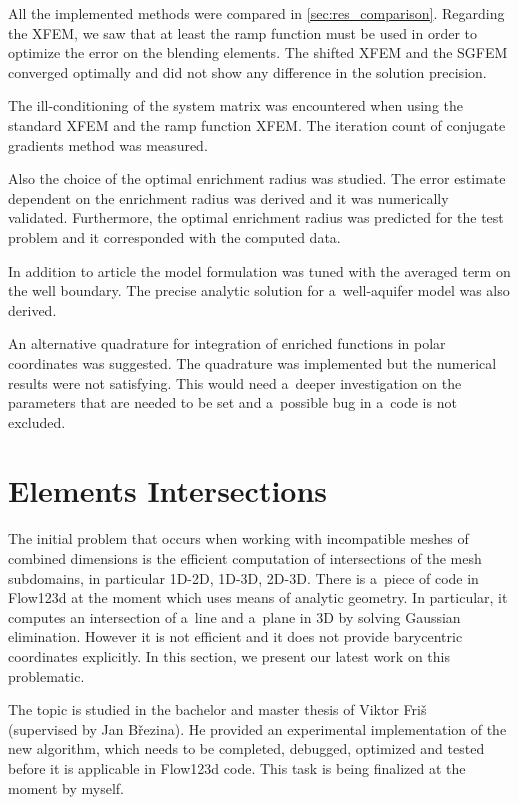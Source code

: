 \documentclass[dvipsnames,FM,Dis]{tulthesis}
\begin{document}
All the implemented methods were compared in \ref{sec:res_comparison}. Regarding the XFEM, we saw that at 
least the ramp function must be used in order to optimize the error on the blending elements. 
The shifted XFEM and the SGFEM converged optimally and did not show any difference in the solution precision.

The ill-conditioning of the system matrix was encountered when using the standard XFEM and the ramp function XFEM.
The iteration count of conjugate gradients method was measured.

Also the choice of the optimal enrichment radius was studied. The error estimate dependent on the enrichment
radius was derived and it was numerically validated. Furthermore, the optimal enrichment radius was predicted 
for the test problem and it corresponded with the computed data.

In addition to article \cite{exner_2016} the model formulation was tuned with the averaged term on the well
boundary. The precise analytic solution for a~well-aquifer model was also derived.

An alternative quadrature for integration of enriched functions in polar coordinates was suggested.
The quadrature was implemented but the numerical results were not satisfying. This would need a~deeper 
investigation on the parameters that are needed to be set and a~possible bug in a~code is not excluded.



\newpage
\section{Elements Intersections}
\label{sec:elements_intersections}
The initial problem that occurs when working with incompatible meshes of combined dimensions is the efficient 
computation of intersections of the mesh subdomains, in particular 1D-2D, 1D-3D, 2D-3D.
There is a~piece of code in Flow123d at the moment which uses means of analytic geometry. In particular, it computes 
an intersection of a~line and a~plane in 3D by solving Gaussian elimination. However it is not efficient
and it does not provide barycentric coordinates explicitly.
In this section, we present our latest work on this problematic.

The topic is studied in the bachelor and master thesis of Viktor Fri{\v s} ~\cite{fris_dp_2015} (supervised by 
Jan B{\v r}ezina). He provided an experimental implementation of the new algorithm, which needs to be completed,
debugged, optimized and tested before it is applicable in Flow123d code. 
This task is being finalized at the moment by myself.
\end{document}
